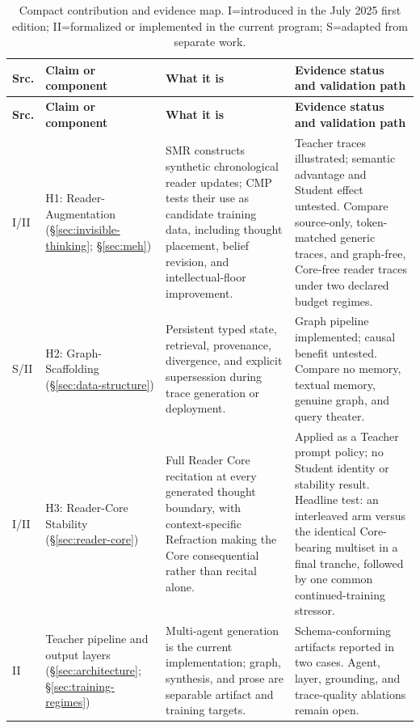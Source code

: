 \documentclass[11pt]{article}
\begin{document}
\begingroup
\small
\setlength{\tabcolsep}{3pt}
\begin{longtable}{
  >{\raggedright\arraybackslash}p{0.65cm}
  >{\raggedright\arraybackslash}p{3.35cm}
  >{\raggedright\arraybackslash}p{4.75cm}
  >{\raggedright\arraybackslash}p{4.75cm}}
\caption{Compact contribution and evidence map. \textsc{I}=introduced in the July 2025 first edition; \textsc{II}=formalized or implemented in the current program; \textsc{S}=adapted from separate work.}
\label{tab:claim-status}\\
\toprule
\textbf{Src.} & \textbf{Claim or component} & \textbf{What it is} & \textbf{Evidence status and validation path} \\
\midrule
\endfirsthead
\toprule
\textbf{Src.} & \textbf{Claim or component} & \textbf{What it is} & \textbf{Evidence status and validation path} \\
\midrule
\endhead
\bottomrule
\endlastfoot
\textsc{I/II} & H1: Reader-Augmentation (\S\ref{sec:invisible-thinking}; \S\ref{sec:meh}) & SMR constructs synthetic chronological reader updates; CMP tests their use as candidate training data, including thought placement, belief revision, and intellectual-floor improvement. & Teacher traces illustrated; semantic advantage and Student effect untested. Compare source-only, token-matched generic traces, and graph-free, Core-free reader traces under two declared budget regimes. \\
\textsc{S/II} & H2: Graph-Scaffolding (\S\ref{sec:data-structure}) & Persistent typed state, retrieval, provenance, divergence, and explicit supersession during trace generation or deployment. & Graph pipeline implemented; causal benefit untested. Compare no memory, textual memory, genuine graph, and query theater. \\
\textsc{I/II} & H3: Reader-Core Stability (\S\ref{sec:reader-core}) & Full Reader Core recitation at every generated thought boundary, with context-specific Refraction making the Core consequential rather than recital alone. & Applied as a Teacher prompt policy; no Student identity or stability result. Headline test: an interleaved arm versus the identical Core-bearing multiset in a final tranche, followed by one common continued-training stressor. \\
\textsc{II} & Teacher pipeline and output layers (\S\ref{sec:architecture}; \S\ref{sec:training-regimes}) & Multi-agent generation is the current implementation; graph, synthesis, and prose are separable artifact and training targets. & Schema-conforming artifacts reported in two cases. Agent, layer, grounding, and trace-quality ablations remain open. \\

\end{longtable}
\end{document}
